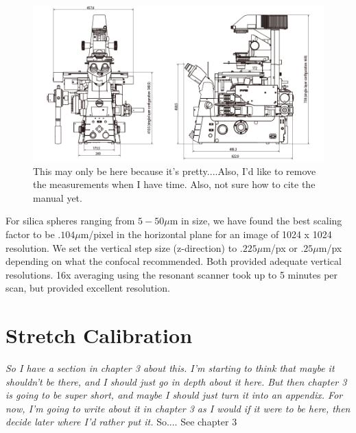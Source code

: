 \begin{figure}
	\centering
	\includegraphics[width=0.7\linewidth]{confocal_stuff/Ti2_diagram_1}
		\caption[Nikon Ti2 Microscope Base]{This may only be here because it's pretty....Also, I'd like to remove the measurements when I have time. Also, not sure how to cite the manual yet.}
	\label{fig:ti2diagram1}
\end{figure}

For silica spheres ranging from $5-50 \mu$m in size, we have found the best scaling factor to be $.104 \mu$m/pixel in the horizontal plane for an image of 1024 x 1024 resolution. We set the vertical step size (z-direction) to $.225 \mu$m/px or $.25 \mu$m/px depending on what the confocal recommended. Both provided adequate vertical resolutions. 16x averaging using the resonant scanner took up to 5 minutes per scan, but provided excellent resolution. 


\section{Stretch Calibration}
\emph{So I have a section in chapter 3 about this. I'm starting to think that maybe it shouldn't be there, and I should just go in depth about it here. But then chapter 3 is going to be super short, and maybe I should just turn it into an appendix. For now, I'm going to write about it in chapter 3 as I would if it were to be here, then decide later where I'd rather put it.} So.... See chapter 3

